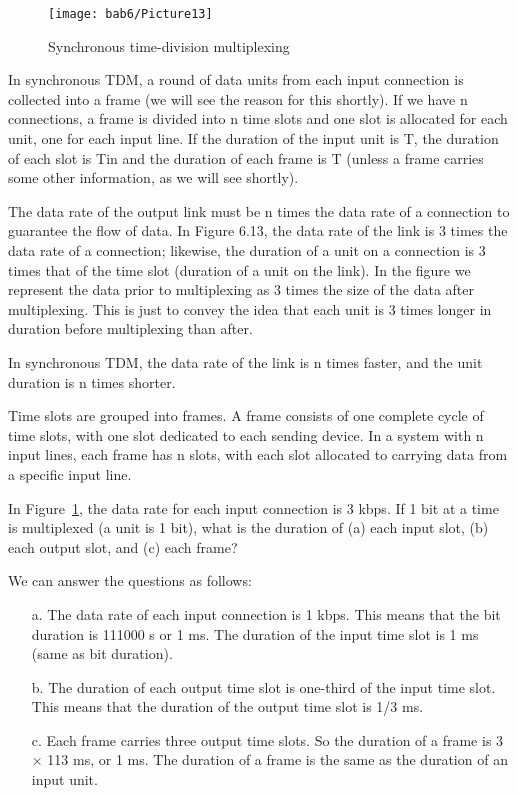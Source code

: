 \begin{figure}[htbp]
  \centering
  \texttt{[image: bab6/Picture13]}
  \caption{Synchronous time-division multiplexing}
  \label{fig6:12}
\end{figure}

In synchronous TDM, a round of data units from each input connection is collected into a frame (we will see the reason for this shortly). If we have n connections, a frame is divided into n time slots and one slot is allocated for each unit, one for each input line. If the duration of the input unit is T, the duration of each slot is Tin and the duration of each frame is T (unless a frame carries some other information, as we will see shortly).

The data rate of the output link must be n times the data rate of a connection to guarantee the flow of data. In Figure 6.13, the data rate of the link is 3 times the data rate of a connection; likewise, the duration of a unit on a connection is 3 times that of the time slot (duration of a unit on the link). In the figure we represent the data prior to multiplexing as 3 times the size of the data after multiplexing. This is just to convey the idea that each unit is 3 times longer in duration before multiplexing than after.

In synchronous TDM, the data rate of the link is n times faster, and the unit duration is n times shorter.

Time slots are grouped into frames. A frame consists of one complete cycle of time slots, with one slot dedicated to each sending device. In a system with n input lines, each frame has n slots, with each slot allocated to carrying data from a specific input line.

\vspace{12pt}

\begin{example}
  In Figure~\ref{fig6:12}, the data rate for each input connection is 3 kbps. If 1 bit at a time is multiplexed (a unit is 1 bit), what is the duration of (a) each input slot, (b) each output slot, and (c) each frame?
  \label{example6:5}
\end{example}

\begin{solution}
  We can answer the questions as follows:
  \begin{itemize}
    \item[a.] The data rate of each input connection is 1 kbps. This means that the bit duration is 111000 s or 1 ms. The duration of the input time slot is 1 ms (same as bit duration).
    \item[b.] The duration of each output time slot is one-third of the input time slot. This means that the duration of the output time slot is 1/3 ms.
    \item[c.] Each frame carries three output time slots. So the duration of a frame is 3 $\times$ 113 ms, or 1 ms. The duration of a frame is the same as the duration of an input unit.
  \end{itemize}
\end{solution}


